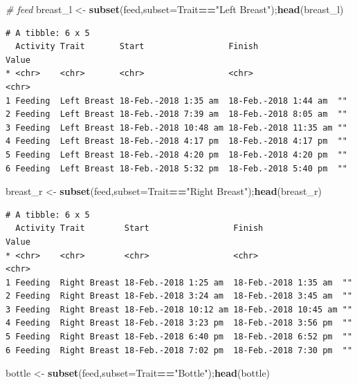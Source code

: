\documentclass[10,portrait]{article}
\newenvironment{Shaded}{\begin{snugshade}}{\end{snugshade}}
\newcommand{\KeywordTok}[1]{\textcolor[rgb]{0.13,0.29,0.53}{\textbf{#1}}}
\newcommand{\DataTypeTok}[1]{\textcolor[rgb]{0.13,0.29,0.53}{#1}}
\newcommand{\StringTok}[1]{\textcolor[rgb]{0.31,0.60,0.02}{#1}}
\newcommand{\CommentTok}[1]{\textcolor[rgb]{0.56,0.35,0.01}{\textit{#1}}}
\newcommand{\OperatorTok}[1]{\textcolor[rgb]{0.81,0.36,0.00}{\textbf{#1}}}
\newcommand{\NormalTok}[1]{#1}
\begin{document}
\begin{Shaded}
\begin{Highlighting}[]
\CommentTok{# feed}
\NormalTok{breast_l <-}\StringTok{ }\KeywordTok{subset}\NormalTok{(feed,}\DataTypeTok{subset=}\NormalTok{Trait}\OperatorTok{==}\StringTok{"Left Breast"}\NormalTok{);}\KeywordTok{head}\NormalTok{(breast_l)}
\end{Highlighting}
\end{Shaded}

\begin{verbatim}
# A tibble: 6 x 5
  Activity Trait       Start                 Finish                Value
* <chr>    <chr>       <chr>                 <chr>                 <chr>
1 Feeding  Left Breast 18-Feb.-2018 1:35 am  18-Feb.-2018 1:44 am  ""   
2 Feeding  Left Breast 18-Feb.-2018 7:39 am  18-Feb.-2018 8:05 am  ""   
3 Feeding  Left Breast 18-Feb.-2018 10:48 am 18-Feb.-2018 11:35 am ""   
4 Feeding  Left Breast 18-Feb.-2018 4:17 pm  18-Feb.-2018 4:17 pm  ""   
5 Feeding  Left Breast 18-Feb.-2018 4:20 pm  18-Feb.-2018 4:20 pm  ""   
6 Feeding  Left Breast 18-Feb.-2018 5:32 pm  18-Feb.-2018 5:40 pm  ""   
\end{verbatim}

\begin{Shaded}
\begin{Highlighting}[]
\NormalTok{breast_r <-}\StringTok{ }\KeywordTok{subset}\NormalTok{(feed,}\DataTypeTok{subset=}\NormalTok{Trait}\OperatorTok{==}\StringTok{"Right Breast"}\NormalTok{);}\KeywordTok{head}\NormalTok{(breast_r)}
\end{Highlighting}
\end{Shaded}

\begin{verbatim}
# A tibble: 6 x 5
  Activity Trait        Start                 Finish                Value
* <chr>    <chr>        <chr>                 <chr>                 <chr>
1 Feeding  Right Breast 18-Feb.-2018 1:25 am  18-Feb.-2018 1:35 am  ""   
2 Feeding  Right Breast 18-Feb.-2018 3:24 am  18-Feb.-2018 3:45 am  ""   
3 Feeding  Right Breast 18-Feb.-2018 10:12 am 18-Feb.-2018 10:45 am ""   
4 Feeding  Right Breast 18-Feb.-2018 3:23 pm  18-Feb.-2018 3:56 pm  ""   
5 Feeding  Right Breast 18-Feb.-2018 6:40 pm  18-Feb.-2018 6:52 pm  ""   
6 Feeding  Right Breast 18-Feb.-2018 7:02 pm  18-Feb.-2018 7:30 pm  ""   
\end{verbatim}

\begin{Shaded}
\begin{Highlighting}[]
\NormalTok{bottle <-}\StringTok{ }\KeywordTok{subset}\NormalTok{(feed,}\DataTypeTok{subset=}\NormalTok{Trait}\OperatorTok{==}\StringTok{"Bottle"}\NormalTok{);}\KeywordTok{head}\NormalTok{(bottle)}
\end{Highlighting}
\end{Shaded}
\end{document}
